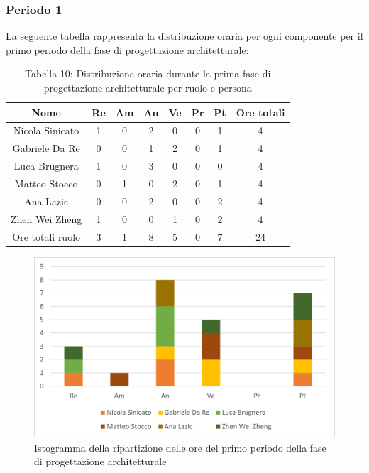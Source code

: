 \subsubsection{Periodo 1}
%
La seguente tabella rappresenta la distribuzione oraria per ogni componente per il primo periodo della fase di progettazione architetturale:
\begin{table}[h]
	\setlength\extrarowheight{5pt}
	\centering
	\begin{tabularx}{\textwidth}{|ccccccc|c|}
		\hline
		\rowcolor{white}
		\textbf{Nome} & \textbf{Re} & \textbf{Am} & \textbf{An} & \textbf{Ve} & \textbf{Pr}& \textbf{Pt} & \textbf{Ore totali} \\
		\hline
		Nicola Sinicato &1&0&2&0&0&1&4 \\
		Gabriele Da Re &0&0&1&2&0&1&4 \\
		Luca Brugnera &1&0&3&0&0&0&4 \\
		Matteo Stocco &0&1&0&2&0&1&4 \\
		Ana Lazic &0&0&2&0&0&2&4 \\
		Zhen Wei Zheng &1&0&0&1&0&2&4 \\
		\hline
		Ore totali ruolo &3&1&8&5&0&7&24 \\
		\hline
	\end{tabularx}
	\vspace{10pt}
	\caption{Tabella 10: Distribuzione oraria durante la prima fase di progettazione architetturale per ruolo e persona}
\end{table}
\begin{figure}[H]
    \centering
    \includegraphics[scale=0.6]{img/grafi preventivo/istogrammi/architetturale/periodo1.png}
    \caption{Istogramma della ripartizione delle ore del primo periodo della fase di progettazione architetturale}
\end{figure}
